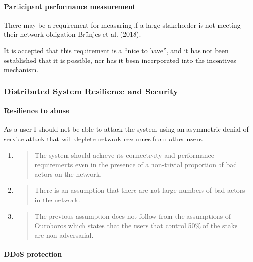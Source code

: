 \documentclass[11pt,a4paper]{article}
\begin{document}
\paragraph{Participant performance measurement}

There may be a requirement for measuring if a large stakeholder is not
meeting their network obligation Brünjes et al. (2018).

It is accepted that this requirement is a ``nice to have'', and it has
not been established that it is possible, nor has it been incorporated
into the incentives mechanism.

\subsubsection{Distributed System Resilience and Security}
\label{distributed-system-resilience-and-security}

\paragraph{Resilience to abuse}

As a user I should not be able to attack the system using an asymmetric
denial of service attack that will deplete network resources from other
users.

\begin{enumerate}
\def\labelenumi{\arabic{enumi}.}
\item
  \begin{quote}
  The system should achieve its connectivity and performance
  requirements even in the presence of a non-trivial proportion of bad
  actors on the network.
  \end{quote}
\item
  \begin{quote}
  There is an assumption that there are not large numbers of bad actors
  in the network.
  \end{quote}
\item
  \begin{quote}
  The previous assumption does not follow from the assumptions of
  Ouroboros which states that the users that control 50\% of the stake
  are non-adversarial.
  \end{quote}
\end{enumerate}

\paragraph{DDoS protection}
\end{document}
